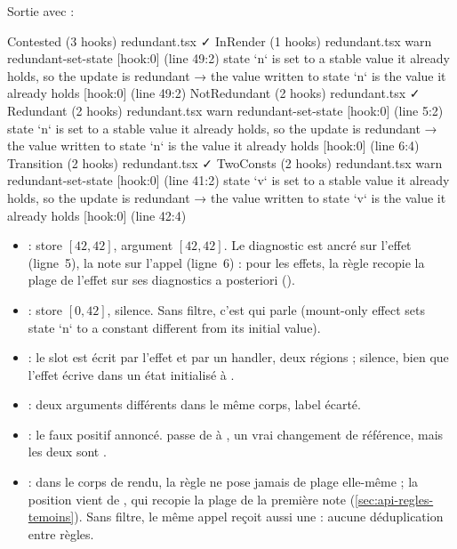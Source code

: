 Sortie avec  :

\begin{sortie}
  Contested  (3 hooks)  redundant.tsx  ✓
  InRender  (1 hooks)  redundant.tsx
    warn   redundant-set-state  [hook:0]  (line 49:2)  state `n` is set to a stable value it already holds, so the update is redundant
       → the value written to state `n` is the value it already holds [hook:0] (line 49:2)
  NotRedundant  (2 hooks)  redundant.tsx  ✓
  Redundant  (2 hooks)  redundant.tsx
    warn   redundant-set-state  [hook:0]  (line 5:2)  state `n` is set to a stable value it already holds, so the update is redundant
       → the value written to state `n` is the value it already holds [hook:0] (line 6:4)
  Transition  (2 hooks)  redundant.tsx  ✓
  TwoConsts  (2 hooks)  redundant.tsx
    warn   redundant-set-state  [hook:0]  (line 41:2)  state `v` is set to a stable value it already holds, so the update is redundant
       → the value written to state `v` is the value it already holds [hook:0] (line 42:4)
\end{sortie}

\begin{itemize}
  \item {} : store $[42,42]$, argument $[42,42]$. Le diagnostic est ancré sur l'effet (ligne~5), la note sur l'appel (ligne~6) : pour les effets, la règle recopie la plage de l'effet sur ses diagnostics a posteriori ().
  \item {} : store $[0,42]$, silence. Sans filtre, c'est  qui parle (\og mount-only effect sets state `n` to a constant different from its initial value\fg).
  \item {} : le slot est écrit par l'effet et par un handler, deux régions ; silence, bien que l'effet écrive  dans un état initialisé à .
  \item {} : deux arguments différents dans le même corps, label écarté.
  \item {} : le faux positif annoncé.  passe de  à , un vrai changement de référence, mais les deux sont .
  \item {} : dans le corps de rendu, la règle ne pose jamais de plage elle-même ; la position  vient de , qui recopie la plage de la première note (\cref{sec:api-regles-temoins}). Sans filtre, le même appel reçoit aussi une \Error{}  : aucune déduplication entre règles.
\end{itemize}

